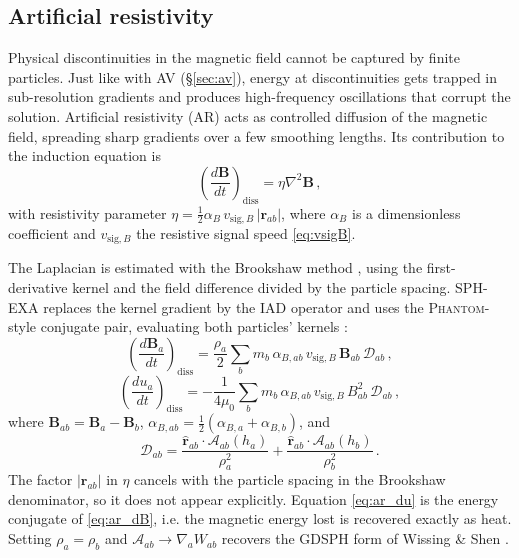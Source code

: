 \subsection{Artificial resistivity}
\label{sec:ar}

Physical discontinuities in the magnetic field cannot be captured by finite particles. Just like with AV (§\ref{sec:av}), energy at discontinuities gets trapped in sub-resolution gradients and produces high-frequency oscillations that corrupt the solution. Artificial resistivity (AR) acts as controlled diffusion of the magnetic field, spreading sharp gradients over a few smoothing lengths. Its contribution to the induction equation is \cite{Price2018, WissingShen2020}
\begin{equation}
    \left(\frac{d\mathbf{B}}{dt}\right)_\mathrm{diss} = \eta \nabla^2 \mathbf{B}\,,
    \label{eq:ar_continuum}
\end{equation}
with resistivity parameter $\eta = \tfrac{1}{2}\alpha_B\, v_{\mathrm{sig},B}\, |\mathbf{r}_{ab}|$, where $\alpha_B$ is a dimensionless coefficient and $v_{\mathrm{sig},B}$ the resistive signal speed \eqref{eq:vsigB}.

The Laplacian is estimated with the Brookshaw method \cite{Brookshaw1985}, using the first-derivative kernel and the field difference divided by the particle spacing. SPH-EXA replaces the kernel gradient by the IAD operator and uses the \textsc{Phantom}-style conjugate pair, evaluating both particles' kernels \cite{Price2018}:
\begin{equation}
    \left(\frac{d\mathbf{B}_a}{dt}\right)_\mathrm{diss} = \frac{\rho_a}{2} \sum_b m_b\, \alpha_{B,ab}\, v_{\mathrm{sig},B}\, \mathbf{B}_{ab}\, \mathcal{D}_{ab}\,,
    \label{eq:ar_dB}
\end{equation}
\begin{equation}
    \left(\frac{du_a}{dt}\right)_\mathrm{diss} = -\frac{1}{4\mu_0} \sum_b m_b\, \alpha_{B,ab}\, v_{\mathrm{sig},B}\, B_{ab}^2\, \mathcal{D}_{ab}\,,
    \label{eq:ar_du}
\end{equation}
where $\mathbf{B}_{ab} = \mathbf{B}_a - \mathbf{B}_b$, $\alpha_{B,ab} = \tfrac{1}{2}(\alpha_{B,a} + \alpha_{B,b})$, and
\begin{equation}
    \mathcal{D}_{ab} = \frac{\hat{\mathbf{r}}_{ab} \cdot \boldsymbol{\mathcal{A}}_{ab}(h_a)}{\rho_a^2} + \frac{\hat{\mathbf{r}}_{ab} \cdot \boldsymbol{\mathcal{A}}_{ab}(h_b)}{\rho_b^2}\,.
    \label{eq:ar_kernel}
\end{equation}
The factor $|\mathbf{r}_{ab}|$ in $\eta$ cancels with the particle spacing in the Brookshaw denominator, so it does not appear explicitly. Equation \eqref{eq:ar_du} is the energy conjugate of \eqref{eq:ar_dB}, i.e. the magnetic energy lost is recovered exactly as heat. Setting $\rho_a = \rho_b$ and $\boldsymbol{\mathcal{A}}_{ab} \to \nabla_a W_{ab}$ recovers the GDSPH form of Wissing \& Shen \cite{WissingShen2020}.

